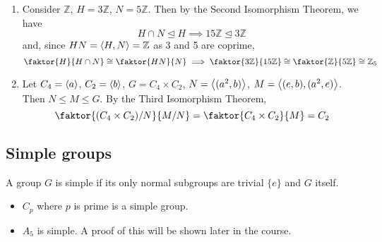 \begin{example}
	\begin{enumerate}
		\item Consider \(\mathbb Z\), \(H = 3 \mathbb Z\), \(N = 5 \mathbb Z\).
			  Then by the Second Isomorphism Theorem, we have
			  \[
				  H \cap N \trianglelefteq H \implies 15\mathbb Z \trianglelefteq 3\mathbb Z
			  \]
			  and, since \(HN = \left\langle{} H, N \right\rangle = \mathbb Z\) as 3 and 5 are coprime,
			  \[
				  \faktor{H}{H \cap N} \cong \faktor{HN}{N} \implies \faktor{3\mathbb Z}{15\mathbb Z} \cong \faktor{\mathbb Z}{5\mathbb Z} \cong \mathbb Z_5
			  \]
		\item Let \(C_4 = \left\langle{} a \right\rangle\), \(C_2 = \left\langle{} b \right\rangle\), \(G = C_4 \times C_2\), \(N = \left\langle{} (a^2, b) \right\rangle\), \(M = \left\langle{} (e, b), (a^2, e) \right\rangle\).
			  Then \(N \leq M \leq G\).
			  By the Third Isomorphism Theorem,
			  \[
				  \faktor{(C_4 \times C_2) / N}{M / N} = \faktor{C_4 \times C_2}{M} = C_2
			  \]
	\end{enumerate}
\end{example}

\subsection{Simple groups}
\begin{definition}
	A group \(G\) is simple if its only normal subgroups are trivial \(\{ e \}\) and \(G\) itself.
\end{definition}
\begin{itemize}
	\item \(C_p\) where \(p\) is prime is a simple group.
	\item \(A_5\) is simple.
	      A proof of this will be shown later in the course.
\end{itemize}
